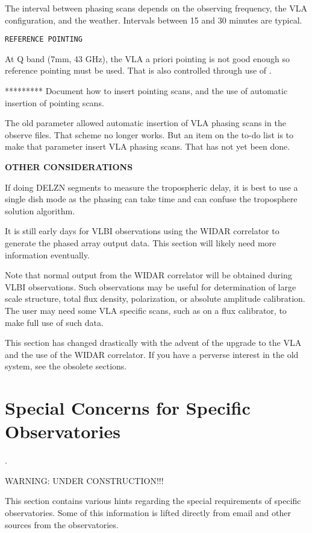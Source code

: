 \documentclass{report}
\begin{document}
The interval between phasing scans depends on the observing frequency,
the VLA configuration, and the weather.  Intervals between 15 and 30 minutes
are typical. %

{\tt REFERENCE POINTING}

At Q band (7mm, 43 GHz), the VLA a priori pointing is not good enough so
reference pointing must be used.  That is also controlled through use
of .

*********  Document how to insert pointing scans, and the use of 
automatic insertion of pointing scans.

The old parameter  allowed automatic
insertion of VLA phasing scans in the observe files.  That scheme no 
longer works.  But an item on the to-do list is to make that parameter
insert VLA phasing scans.  That has not yet been done.


{\bf OTHER CONSIDERATIONS}

If doing DELZN segments to measure the tropospheric delay, it is best
to use a single dish mode as the phasing can take time and can confuse 
the troposphere solution algorithm.

It is still early days for VLBI observations using the WIDAR correlator
to generate the phased array output data.  This section will likely
need more information eventually.

Note that normal output from the WIDAR correlator will be obtained during
VLBI observations.  Such observations may be useful for determination 
of large scale structure, total flux density, polarization, or absolute
amplitude calibration.  The user may need some VLA specific scans, such
as on a flux calibrator, to make full use of such data.

This section has changed drastically with the advent of the upgrade
to the VLA and the use of the WIDAR correlator.  If you have a perverse
interest in the old system, see the obsolete sections.


\section{\label{SEC:INDIV}Special Concerns for Specific Observatories}.

WARNING:  UNDER CONSTRUCTION!!!

This section contains various hints regarding the special requirements
of specific observatories.  Some of this information is lifted directly
from email and other sources from the observatories.
\end{document}
